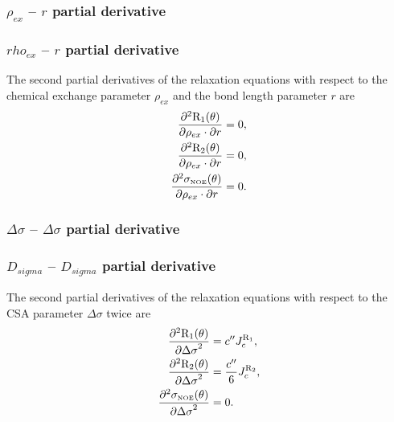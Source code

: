 \begin{latexonly}
    \subsubsection{$\rho_{ex}$ -- $r$ partial derivative}
\end{latexonly}
\begin{htmlonly}
    \subsubsection{$rho_{ex}$ -- $r$ partial derivative}
\end{htmlonly}

The second partial derivatives of the relaxation equations with respect to the chemical exchange parameter $\rho_{ex}$ and the bond length parameter $r$ are
\begin{subequations}
\begin{align}
    \frac{\partial^2 \mathrm{R}_1(\theta)}{\partial \rho_{ex} \cdot \partial r} &= 0,           \label{eq: Ri': d2R1/dRex.dr} \\
    \frac{\partial^2 \mathrm{R}_2(\theta)}{\partial \rho_{ex} \cdot \partial r} &= 0,           \label{eq: Ri': d2R2/dRex.dr} \\
    \frac{\partial^2 \sigma_{\scriptscriptstyle \mathrm{NOE}}(\theta)}{\partial \rho_{ex} \cdot \partial r} &= 0.    \label{eq: Ri': d2sigmaNOE/dRex.dr}
\end{align}
\end{subequations}


\begin{latexonly}
    \subsubsection{$\Delta\sigma$ -- $\Delta\sigma$ partial derivative}
\end{latexonly}
\begin{htmlonly}
    \subsubsection{$D_{sigma}$ -- $D_{sigma}$ partial derivative}
\end{htmlonly}

The second partial derivatives of the relaxation equations with respect to the CSA parameter $\Delta\sigma$ twice are
\begin{subequations}
\begin{align}
    \frac{\partial^2 \mathrm{R}_1(\theta)}{{\partial \Delta\sigma}^2} &= c'' J_c^{\mathrm{R}_1},              \label{eq: Ri': d2R1/dCSA2} \\
    \frac{\partial^2 \mathrm{R}_2(\theta)}{{\partial \Delta\sigma}^2} &= \frac{c''}{6} J_c^{\mathrm{R}_2},    \label{eq: Ri': d2R2/dCSA2} \\
    \frac{\partial^2 \sigma_{\scriptscriptstyle \mathrm{NOE}}(\theta)}{{\partial \Delta\sigma}^2} &= 0.                   \label{eq: Ri': d2sigmaNOE/dCSA2}
\end{align}
\end{subequations}



